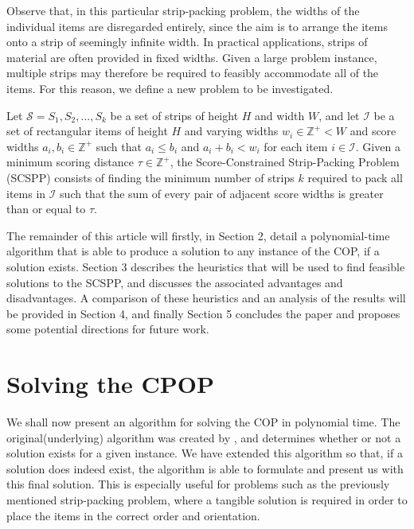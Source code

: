 \documentclass[oribibl]{llncs}
\begin{document}
Observe that, in this particular strip-packing problem, the widths of the individual items are disregarded entirely, since the aim is to arrange the items onto a strip of seemingly infinite width. In practical applications, strips of material are often provided in fixed widths. Given a large problem instance, multiple strips may therefore be required to feasibly accommodate all of the items. For this reason, we define a new problem to be investigated.

\begin{definition}
	\label{defn:scspp}
	Let $\mathcal{S} = S_1, S_2, ..., S_k$ be a set of strips of height $H$ and width $W$, and let $\mathcal{I}$ be a set of rectangular items of height $H$ and varying widths $w_i \in \mathbb{Z}^+ < W$ and score widths $a_i, b_i \in \mathbb{Z}^+$ such that $a_i \leq b_i$ and $a_i + b_i < w_i$ for each item $i \in \mathcal{I}$. Given a minimum scoring distance $\tau \in \mathbb{Z}^+$, the Score-Constrained Strip-Packing Problem (SCSPP) consists of finding the minimum number of strips $k$ required to pack all items in $\mathcal{I}$ such that the sum of every pair of adjacent score widths is greater than or equal to $\tau$.
\end{definition}

The remainder of this article will firstly, in Section 2, detail a polynomial-time algorithm that is able to produce a solution to any instance of the COP, if a solution exists. Section 3 describes the heuristics that will be used to find feasible solutions to the SCSPP, and discusses the associated advantages and disadvantages. A comparison of these heuristics and an analysis of the results will be provided in Section 4, and finally Section 5 concludes the paper and proposes some potential directions for future work.


\section{Solving the CPOP}
\label{sec:ahca}

We shall now present an algorithm for solving the COP in polynomial time. The original(underlying) algorithm was created by \cite{becker2010}, and determines whether or not a solution exists for a given instance. We have extended this algorithm so that, if a solution does indeed exist, the algorithm is able to formulate and present us with this final solution. This is especially useful for problems such as the previously mentioned strip-packing problem, where a tangible solution is required in order to place the items in the correct order and orientation.
\end{document}
